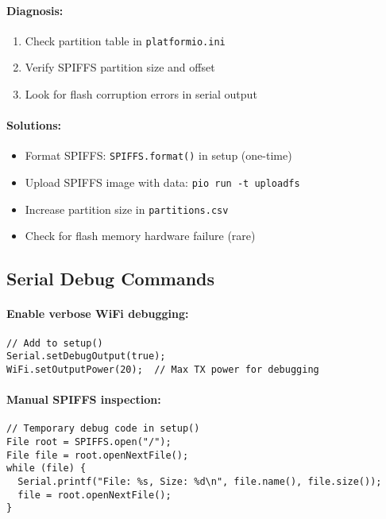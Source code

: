 \documentclass[11pt,a4paper]{article}
\begin{document}
\paragraph{Diagnosis:}
\begin{enumerate}[leftmargin=*]
  \item Check partition table in \texttt{platformio.ini}
  \item Verify SPIFFS partition size and offset
  \item Look for flash corruption errors in serial output
\end{enumerate}

\paragraph{Solutions:}
\begin{itemize}[leftmargin=*]
  \item Format SPIFFS: \texttt{SPIFFS.format()} in setup (one-time)
  \item Upload SPIFFS image with data: \texttt{pio run -t uploadfs}
  \item Increase partition size in \texttt{partitions.csv}
  \item Check for flash memory hardware failure (rare)
\end{itemize}

\subsection{Serial Debug Commands}

\paragraph{Enable verbose WiFi debugging:}
\begin{verbatim}
// Add to setup()
Serial.setDebugOutput(true);
WiFi.setOutputPower(20);  // Max TX power for debugging
\end{verbatim}

\paragraph{Manual SPIFFS inspection:}
\begin{verbatim}
// Temporary debug code in setup()
File root = SPIFFS.open("/");
File file = root.openNextFile();
while (file) {
  Serial.printf("File: %s, Size: %d\n", file.name(), file.size());
  file = root.openNextFile();
}
\end{verbatim}
\end{document}
